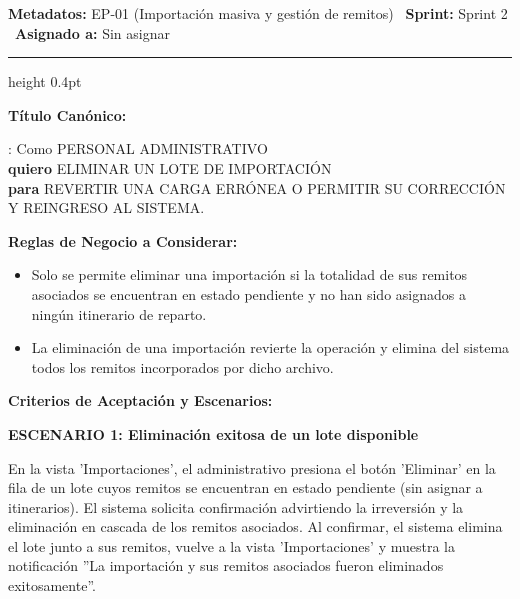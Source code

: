 \documentclass[a4paper,9pt]{article}
\begin{document}
\begin{tcolorbox}[hucard, title={\textbf{HU-40: ELIMINAR UNA IMPORTACIÓN} \hfill \scriptsize \colorbox{tealstatus}{\textbf{\ Accepted\ }} \quad \colorbox{white}{\textcolor{primarydark}{\textbf{\ 5 pts\ }}}}]
\vspace{-1pt}
\noindent\textbf{\footnotesize Metadatos:} EP-01 (Importación masiva y gestión de remitos) \textbar\ \textbf{Sprint:} Sprint 2 \textbar\ \textbf{Asignado a:} Sin asignar\par\vspace{2pt}
\hrule height 0.4pt\par\vspace{3pt}
\noindent\textbf{\footnotesize Título Canónico:}\par\vspace{1pt}
{\small : Como PERSONAL ADMINISTRATIVO \\ \textbf{quiero} ELIMINAR UN LOTE DE IMPORTACIÓN \\ \textbf{para} REVERTIR UNA CARGA ERRÓNEA O PERMITIR SU CORRECCIÓN Y REINGRESO AL SISTEMA.}\par\vspace{3pt}
\noindent\textbf{\footnotesize Reglas de Negocio a Considerar:}\par\vspace{1pt}
{\footnotesize
\begin{itemize}[leftmargin=12pt, nosep, itemsep=1.5pt, topsep=1pt]
\item Solo se permite eliminar una importación si la totalidad de sus remitos asociados se encuentran en estado pendiente y no han sido asignados a ningún itinerario de reparto.
\item La eliminación de una importación revierte la operación y elimina del sistema todos los remitos incorporados por dicho archivo.
\end{itemize}
}\par\vspace{3pt}
\noindent\textbf{\footnotesize Criterios de Aceptación y Escenarios:}\par\vspace{2pt}
{\footnotesize
\noindent\textbf{\textcolor{secondarydark}{ESCENARIO 1:  Eliminación exitosa de un lote disponible}}\par\vspace{1pt}
En la vista 'Importaciones', el administrativo presiona el botón 'Eliminar' en la fila de un lote cuyos remitos se encuentran en estado pendiente (sin asignar a itinerarios). El sistema solicita confirmación advirtiendo la irreversión y la eliminación en cascada de los remitos asociados. Al confirmar, el sistema elimina el lote junto a sus remitos, vuelve a la vista 'Importaciones' y muestra la notificación ''La importación y sus remitos asociados fueron eliminados exitosamente''.\par\vspace{2.5pt}
}
\end{tcolorbox}
\end{document}
